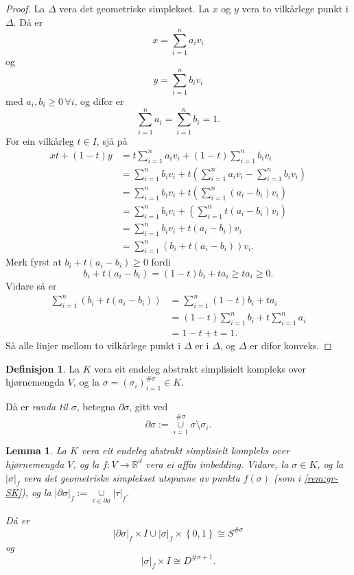 \documentclass[a4paper, 12pt, norsk]{article}
\theoremstyle{plain}
\newtheorem{lemma}[theorem]{Lemma}
\theoremstyle{definition}
\newtheorem{definition}[theorem]{Definisjon}
\newcommand{\Rb}{\mathbb{R}}
\newcommand{\union}{ \mathop{\cup}\limits }
\newcommand{\gr}[1]{ \lvert #1 \rvert } %
\newcommand{\set}[1]{ \left\{ #1 \right\} } %
\newcommand{\tuple}[1]{ \left( #1 \right) } %
\begin{document}
\begin{proof}
	La \( \Delta \) vera det geometriske simplekset. La \( x \) og  \( y \) vera to vilkårlege punkt i \( \Delta \). Då er
	\[
		x = \sum_{i=1}^n a_i v_i
	\]
	og
	\[
		y = \sum_{i=1}^n b_i v_i
	\]
	med \( a_i, b_i \geq 0 \, \forall i \), og difor er
	\[
		\sum_{i=1}^n a_i = \sum_{i=1}^n b_i = 1.
	\]
	For ein vilkårleg \( t \in I \), sjå på
	\begin{align*}
		xt + (1-t)y &= t \sum_{i=1}^n a_i v_i + (1-t)\sum_{i=1}^n b_i v_i \\
		&= \sum_{i=1}^n b_i v_i +t\tuple{\sum_{i=1}^n a_i v_i-\sum_{i=1}^n b_i v_i} \\
		&= \sum_{i=1}^n b_i v_i +t\tuple{\sum_{i=1}^n (a_i-b_i) v_i} \\
		&= \sum_{i=1}^n b_i v_i +\tuple{\sum_{i=1}^n t(a_i-b_i) v_i} \\
		&= \sum_{i=1}^n b_i v_i +t(a_i-b_i) v_i \\
		&= \sum_{i=1}^n (b_i+t(a_i-b_i)) v_i.
	\end{align*}
	Merk fyrst at \( b_i+t(a_i-b_i) \geq 0 \) fordi 
	\[ 
		b_i+t(a_i-b_i) = (1-t)b_i+ta_i \geq ta_i \geq 0.
	\]
	Vidare så er
	\begin{align*}
		\sum_{i=1}^n (b_i+t(a_i-b_i)) &= \sum_{i=1}^n (1-t)b_i+ta_i \\
		&= (1-t)\sum_{i=1}^n b_i + t \sum_{i=1}^n a_i \\
		&= 1 - t + t = 1.
	\end{align*}
	Så alle linjer mellom to vilkårlege punkt i \( \Delta \) er i \( \Delta \), og \( \Delta \) er difor konveks.
\end{proof}

\begin{definition}
	La \( K \) vera eit endeleg abstrakt simplisielt kompleks over hjørnemengda \( V \), og la \( \sigma = \tuple{\sigma_i}_{i=1}^{\#\sigma} \in K \). 
	
	Då er \emph{randa til \( \sigma \)}, betegna \( \partial\sigma \), gitt ved
	\[
		\partial\sigma := \union_{i = 1}^{\#\sigma} \sigma \setminus \sigma_i.
	\]
\end{definition}

\begin{lemma} \label{thm:utvida-funk}
	La \( K \) vera eit endeleg abstrakt simplisielt kompleks over hjørnemengda \( V \), og la \( f: V \to \Rb^d \) vera ei affin imbedding. Vidare, la \( \sigma \in K \), og la \( \gr{\sigma}_f \) vera det geometriske simplekset utspunne av punkta \( f(\sigma) \) (som i \autoref{rem:gr-SK}), og la \( \gr{\partial\sigma}_f := \union_{\tau \in \partial\sigma} \gr{\tau}_f \). 
	
	Då er
	\[
		\gr{\partial\sigma}_f \times I \union \gr{\sigma}_f \times \set{0, 1} \cong S^{\#\sigma}
	\]
	og
	\[
		\gr{\sigma}_f \times I \cong D^{\#\sigma+1}.
	\] 
\end{lemma}
\end{document}
